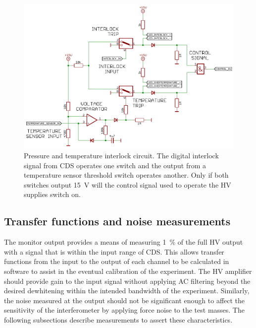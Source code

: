 \begin{figure}[htp]
  \centering
  \includegraphics[width=\columnwidth]{graphics/60-hv-amp-interlock.pdf}
  \caption[High voltage amplifier interlock schematic]{\label{fig:hv-amp-interlock}Pressure and temperature interlock circuit. The digital interlock signal from \gls{CDS} operates one switch and the output from a temperature sensor threshold switch operates another. Only if both switches output \SI{15}{\volt} will the control signal used to operate the \gls{HV} supplies switch on.}
\end{figure}

\subsection{Transfer functions and noise measurements}
The monitor output provides a means of measuring \SI{1}{\percent} of the full \gls{HV} output with a signal that is within the input range of \gls{CDS}. This allows transfer functions from the input to the output of each channel to be calculated in software to assist in the eventual calibration of the experiment. The \gls{HV} amplifier should provide gain to the input signal without applying \gls{AC} filtering beyond the desired dewhitening within the intended bandwidth of the experiment. Similarly, the noise measured at the output should not be significant enough to affect the sensitivity of the interferometer by applying force noise to the test masses. The following subsections describe measurements to assert these characteristics.

